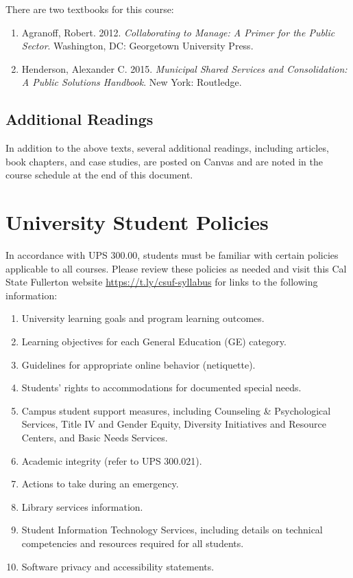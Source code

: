 \documentclass[12pt, letterpaper]{article}
\begin{document}
There are two textbooks for this course:

\begin{enumerate}[leftmargin=!,labelindent=5pt,itemindent=-15pt]
    \item Agranoff, Robert. 2012. \emph{Collaborating to Manage: A Primer for the Public Sector}. Washington, DC: Georgetown University Press.

    \item  Henderson, Alexander C. 2015. \emph{Municipal Shared Services and Consolidation: A Public Solutions Handbook}. New York: Routledge.
\end{enumerate}

\subsection*{Additional Readings}

In addition to the above texts, several additional readings, including articles, book chapters, and case studies, are posted on Canvas and are noted in the course schedule at the end of this document. 


\section{University Student Policies}

In accordance with UPS 300.00, students must be familiar with certain policies applicable to all courses. Please review these policies as needed and visit this Cal State Fullerton website \href{https://t.ly/csuf-syllabus}{https://t.ly/csuf-syllabus} for links to the following information:

\begin{enumerate}
    \item   University learning goals and program learning outcomes.
    \item	Learning objectives for each General Education (GE) category.
    \item	Guidelines for appropriate online behavior (netiquette).
    \item	Students’ rights to accommodations for documented special needs.
    \item   Campus student support measures, including Counseling \& Psychological Services, Title IV and Gender Equity, Diversity Initiatives and Resource Centers, and Basic Needs Services.
    \item	Academic integrity (refer to UPS 300.021).
    \item	Actions to take during an emergency.
    \item	Library services information.
    \item	Student Information Technology Services, including details on technical competencies and resources required for all students.
    \item	Software privacy and accessibility statements.
\end{enumerate}
\end{document}
